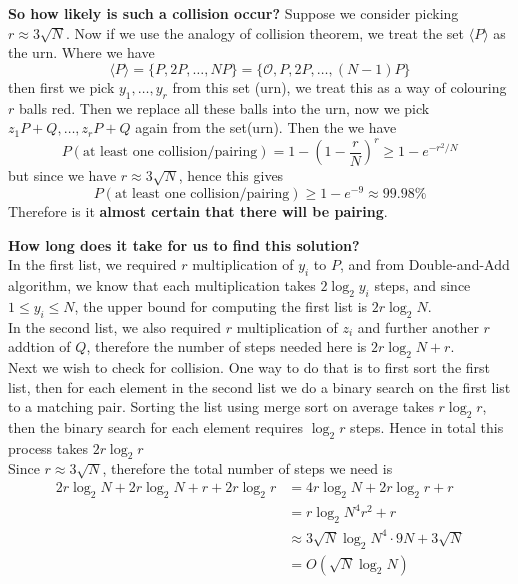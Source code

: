 \documentclass[a4 paper]{article}
\newcommand{\?}{\stackrel{?}{=}}
\begin{document}
\textbf{So how likely is such a collision occur? }Suppose we consider picking $ r \approx 3 \sqrt{N} $. Now if we use the analogy of collision theorem, we treat the set $ \langle P \rangle $ as the urn. Where we have
$$ \langle P  \rangle = \{P , 2P , \dots, NP \} = \{ \mathcal{O} , P ,2 P ,\dots, (N-1)P\} $$
then first we pick $ y_1 ,\dots, y_r $ from this set (urn), we treat this as a way of colouring $ r $ balls red. Then we replace all these balls into the urn, now we pick $ z_1 P + Q , \dots, z_r P+ Q $ again from the set(urn). Then the we have 
$$ P (\text{at least one collision/pairing}) = 1 - \left(1 - \frac{r}{N}\right)^r \geq 1 - e^{- r^2 / N} $$ 
but since we have $ r \approx 3 \sqrt{N} $, hence this gives 
$$ P (\text{at least one collision/pairing})  \geq 1 - e^{- 9} \approx 99.98\%$$ 
Therefore is it \textbf{almost certain that there will be pairing}.

\begin{note}{\bcicosaedre}
\textbf{How long does it take for us to find this solution?}\\ 
In the first list, we required $ r $ multiplication of $ y_i $ to $ P $, and from Double-and-Add algorithm, we know that each multiplication takes $ 2 \log_2 y_i $ steps, and since $ 1 \leq y_i \leq N $, the upper bound for computing the first list is $ 2 r\log_2 N $. \\ 
In the second list, we also required $ r $ multiplication of $ z_i $ and further another $ r $ addtion of $ Q $, therefore the number of steps needed here is $ 2r\log_2 N + r  $. \\ 
Next we wish to check for collision. One way to do that is to first sort the first list, then for each element in the second list we do a binary search on the first list to a matching pair. Sorting the list using merge sort on average takes $ r \log_2 r $, then the binary search for each element requires $ \log_2 r  $ steps. Hence in total this process takes $ 2r\log_2 r $ \\ 
Since $ r \approx 3 \sqrt{N} $, therefore the total number of steps we need is
\begin{align*}
    2r \log_2 N  +2r \log_2 N + r + 2r\log_2 r& = 4r\log_2 N + 2r\log_2 r + r \\ 
                                             & = r\log_2N^4r^2 +r  \\ 
                                             & \approx 3 \sqrt{N} \log_2 N^4 \cdot 9 N + 3 \sqrt{N}  \\ 
                                             & = \boxed{O (\sqrt{N} \log_2 N )} 
\end{align*}
\end{note}
\end{document}
